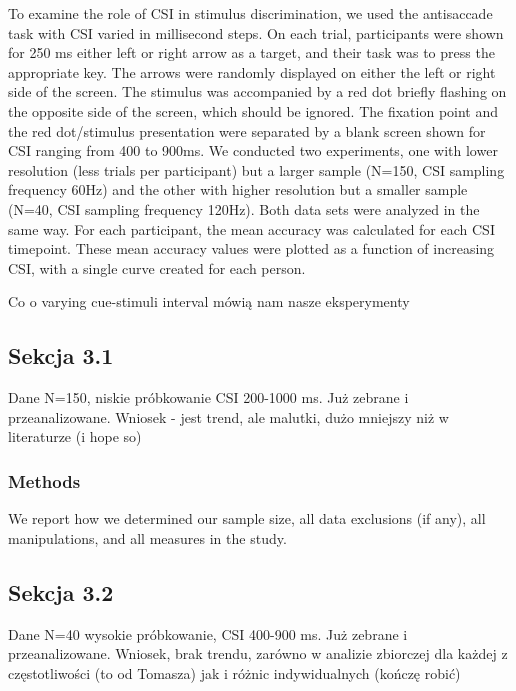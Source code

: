 \documentclass[
  man,draftall]{apa6}
\begin{document}
To examine the role of CSI in stimulus discrimination, we used the antisaccade
task with CSI varied in millisecond steps. On each trial, participants were shown for 250 ms
either left or right arrow as a target, and their task was to press the appropriate
key. The arrows were randomly displayed on either the left or right side of the
screen. The stimulus was accompanied by a red dot briefly flashing on the
opposite side of the screen, which should be ignored. The fixation point and
the red dot/stimulus presentation were separated by a blank screen shown for
CSI ranging from 400 to 900ms. We conducted two experiments, one with lower
resolution (less trials per participant) but a larger sample (N=150, CSI sampling
frequency 60Hz) and the other with higher resolution but a smaller sample
(N=40, CSI sampling frequency 120Hz). Both data sets were analyzed in the
same way. For each participant, the mean accuracy was calculated for each CSI
timepoint. These mean accuracy values were plotted as a function of increasing
CSI, with a single curve created for each person.

Co o varying cue-stimuli interval mówią nam nasze eksperymenty

\hypertarget{sekcja-3.1}{%
\subsection{Sekcja 3.1}\label{sekcja-3.1}}

Dane N=150, niskie próbkowanie CSI 200-1000 ms. Już zebrane i przeanalizowane.
Wniosek - jest trend, ale malutki, dużo mniejszy niż w literaturze (i hope so)

\hypertarget{methods}{%
\subsubsection{Methods}\label{methods}}

We report how we determined our sample size, all data exclusions (if any), all manipulations, and all measures in the study.

\hypertarget{sekcja-3.2}{%
\subsection{Sekcja 3.2}\label{sekcja-3.2}}

Dane N=40 wysokie próbkowanie, CSI 400-900 ms. Już zebrane i przeanalizowane. Wniosek, brak trendu, zarówno w analizie zbiorczej dla każdej z częstotliwości (to od Tomasza) jak i różnic indywidualnych (kończę robić)
\end{document}
